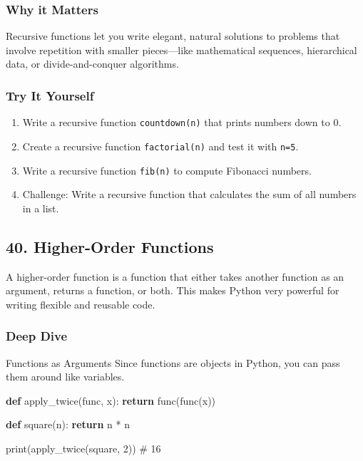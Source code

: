 \documentclass[
  letterpaper,
  DIV=11,
  numbers=noendperiod]{scrreprt}
\newenvironment{Shaded}{\begin{snugshade}}{\end{snugshade}}
\newcommand{\BuiltInTok}[1]{\textcolor[rgb]{0.00,0.23,0.31}{#1}}
\newcommand{\CommentTok}[1]{\textcolor[rgb]{0.37,0.37,0.37}{#1}}
\newcommand{\ControlFlowTok}[1]{\textcolor[rgb]{0.00,0.23,0.31}{\textbf{#1}}}
\newcommand{\DecValTok}[1]{\textcolor[rgb]{0.68,0.00,0.00}{#1}}
\newcommand{\KeywordTok}[1]{\textcolor[rgb]{0.00,0.23,0.31}{\textbf{#1}}}
\newcommand{\NormalTok}[1]{\textcolor[rgb]{0.00,0.23,0.31}{#1}}
\newcommand{\OperatorTok}[1]{\textcolor[rgb]{0.37,0.37,0.37}{#1}}
\providecommand{\tightlist}{%
  \setlength{\itemsep}{0pt}\setlength{\parskip}{0pt}}
\begin{document}
\subsubsection{Why it Matters}\label{why-it-matters-38}

Recursive functions let you write elegant, natural solutions to problems
that involve repetition with smaller pieces---like mathematical
sequences, hierarchical data, or divide-and-conquer algorithms.

\subsubsection{Try It Yourself}\label{try-it-yourself-38}

\begin{enumerate}
\def\labelenumi{\arabic{enumi}.}
\tightlist
\item
  Write a recursive function \texttt{countdown(n)} that prints numbers
  down to 0.
\item
  Create a recursive function \texttt{factorial(n)} and test it with
  \texttt{n=5}.
\item
  Write a recursive function \texttt{fib(n)} to compute Fibonacci
  numbers.
\item
  Challenge: Write a recursive function that calculates the sum of all
  numbers in a list.
\end{enumerate}

\subsection{40. Higher-Order Functions}\label{higher-order-functions}

A higher-order function is a function that either takes another function
as an argument, returns a function, or both. This makes Python very
powerful for writing flexible and reusable code.

\subsubsection{Deep Dive}\label{deep-dive-39}

Functions as Arguments Since functions are objects in Python, you can
pass them around like variables.

\begin{Shaded}
\begin{Highlighting}[]
\KeywordTok{def}\NormalTok{ apply\_twice(func, x):}
    \ControlFlowTok{return}\NormalTok{ func(func(x))}

\KeywordTok{def}\NormalTok{ square(n):}
    \ControlFlowTok{return}\NormalTok{ n }\OperatorTok{*}\NormalTok{ n}

\BuiltInTok{print}\NormalTok{(apply\_twice(square, }\DecValTok{2}\NormalTok{))   }\CommentTok{\# 16}
\end{Highlighting}
\end{Shaded}
\end{document}
